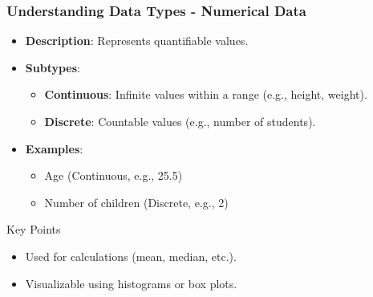 \documentclass[aspectratio=169]{beamer}
\begin{document}
\begin{frame}[fragile]
    \frametitle{Understanding Data Types - Numerical Data}
    \begin{itemize}
        \item \textbf{Description}: Represents quantifiable values.
        \item \textbf{Subtypes}:
            \begin{itemize}
                \item \textbf{Continuous}: Infinite values within a range (e.g., height, weight).
                \item \textbf{Discrete}: Countable values (e.g., number of students).
            \end{itemize}
        \item \textbf{Examples}:
            \begin{itemize}
                \item Age (Continuous, e.g., 25.5)
                \item Number of children (Discrete, e.g., 2)
            \end{itemize}
    \end{itemize}
    \begin{block}{Key Points}
        \begin{itemize}
            \item Used for calculations (mean, median, etc.).
            \item Visualizable using histograms or box plots.
        \end{itemize}
    \end{block}
\end{frame}
\end{document}
